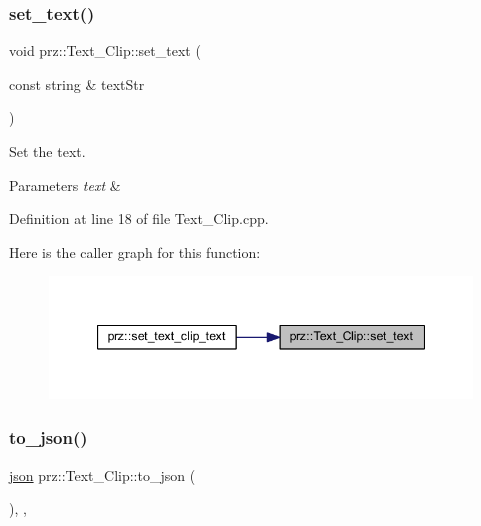 \subsubsection{\texorpdfstring{set\_text()}{set\_text()}}
{\footnotesize\ttfamily void prz\+::\+Text\+\_\+\+Clip\+::set\+\_\+text (\begin{DoxyParamCaption}\item[{const string \&}]{text\+Str }\end{DoxyParamCaption})}



Set the text. 


\begin{DoxyParams}{Parameters}
{\em text} & \\
\hline
\end{DoxyParams}


Definition at line 18 of file Text\+\_\+\+Clip.\+cpp.

Here is the caller graph for this function\+:
\nopagebreak
\begin{figure}[H]
\begin{center}
\leavevmode
\includegraphics[width=347pt]{classprz_1_1_text___clip_a202deb59702755d44bcec29fc7e69f8c_icgraph}
\end{center}
\end{figure}
\mbox{\label{classprz_1_1_text___clip_a4e78e6e36c130ed42ec7f75772e3baed}} 
\subsubsection{\texorpdfstring{to\_json()}{to\_json()}}
{\footnotesize\ttfamily \mbox{\hyperlink{namespaceprz_a2d8e9eeb62cf098759f1fff869da67f7}{json}} prz\+::\+Text\+\_\+\+Clip\+::to\+\_\+json (\begin{DoxyParamCaption}{ }\end{DoxyParamCaption})\hspace{0.3cm}{\ttfamily [final]}, {\ttfamily [override]}, {\ttfamily [virtual]}}

